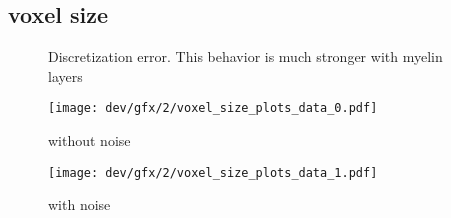 \subsection{voxel size}
% 
\begin{figure}[!t]
\centering
\resizebox{1.0\textwidth}{!}{
\tikzset{external/export=false}
}
\caption[Discretization error]{Discretization error.
This behavior is much stronger with myelin layers}
\label{fig:vectorfield_disc_error}
\end{figure}
% 
\begin{figure}[p]
\centering
\texttt{[image: dev/gfx/2/voxel\_size\_plots\_data\_0.pdf]}
\caption[]{without noise \dummy{}}
\label{fig:voxelsize}
\end{figure}
% 
\begin{figure}[p]
\centering
\texttt{[image: dev/gfx/2/voxel\_size\_plots\_data\_1.pdf]}
\caption[]{with noise \dummy{}}
\label{fig:voxelsize}
\end{figure}
% 
% 
% 
